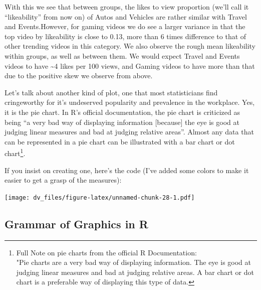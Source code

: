 \documentclass[]{article}
\newenvironment{Shaded}{\begin{snugshade}}{\end{snugshade}}
\newcommand{\DataTypeTok}[1]{\textcolor[rgb]{0.13,0.29,0.53}{#1}}
\newcommand{\DecValTok}[1]{\textcolor[rgb]{0.00,0.00,0.81}{#1}}
\newcommand{\KeywordTok}[1]{\textcolor[rgb]{0.13,0.29,0.53}{\textbf{#1}}}
\newcommand{\NormalTok}[1]{#1}
\newcommand{\OperatorTok}[1]{\textcolor[rgb]{0.81,0.36,0.00}{\textbf{#1}}}
\begin{document}
With this we see that between groups, the likes to view proportion
(we'll call it ``likeability'' from now on) of Autos and Vehicles are
rather similar with Travel and Events.However, for gaming videos we do
see a larger variance in that the top video by likeability is close to
0.13, more than 6 times difference to that of other trending videos in
this category. We also observe the rough mean likeability within groups,
as well as between them. We would expect Travel and Events videos to
have \textasciitilde{}4 likes per 100 views, and Gaming videos to have
more than that due to the positive skew we observe from above.

Let's talk about another kind of plot, one that most statisticians find
cringeworthy for it's undeserved popularity and prevalence in the
workplace. Yes, it is the pie chart. In R's official documentation, the
pie chart is criticized as being ``a very bad way of displaying
information {[}because{]} the eye is good at judging linear measures and
bad at judging relative areas''. Almost any data that can be represented
in a pie chart can be illustrated with a bar chart or dot
chart\footnote{Full Note on pie charts from the official R
  Documentation:\\
  "Pie charts are a very bad way of displaying information. The eye is
  good at judging linear measures and bad at judging relative areas. A
  bar chart or dot chart is a preferable way of displaying this type of
  data.}.

If you insist on creating one, here's the code (I've added some colors
to make it easier to get a grasp of the measures):

\begin{Shaded}
\end{Shaded}

\texttt{[image: dv\_files/figure-latex/unnamed-chunk-28-1.pdf]}

\hypertarget{grammar-of-graphics-in-r}{%
\subsection{Grammar of Graphics in R}\label{grammar-of-graphics-in-r}}
\end{document}
